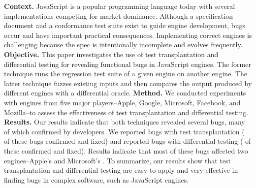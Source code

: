 \textbf{Context.}
JavaScript is a popular programming language today with several
implementations competing for market dominance. Although a
specification document and a conformance test suite exist to guide
engine development, bugs occur and have important practical
consequences. Implementing correct
engines is challenging because the spec is intentionally
incomplete and evolves frequently.
\textbf{Objective.}
This paper investigates the use of test transplantation and
differential testing for revealing functional bugs in JavaScript
engines.  The former technique runs the regression test suite of a
given engine on another engine.  The latter technique fuzzes existing
inputs and then compares the output produced by different engines with
a differential oracle.
\textbf{Method.}
We conducted experiments with engines from five major players--Apple,
Google, Microsoft, Facebook, and Mozilla--to assess the effectiveness
of test transplantation and differential testing.
\textbf{Results.}
Our results indicate that both techniques revealed several bugs, many of which
confirmed by developers. We reported \noBugsTransplantation{} bugs
with test transplantation (\noBugsTransplantationConfirmed{} of these bugs
confirmed and \noBugsTransplantationFixed{} fixed) and reported
\noBugsDifferentialTesting{} bugs with differential testing
(\noBugsDifferentialTestingConfirmed{} of these confirmed
and \noBugsDifferentialTestingFixed{} fixed). Results indicate that
most of these bugs affected two engines--Apple's
\jsc{} and Microsoft's \chakra{}.
To summarize, our results show that
test transplantation and differential testing
are easy to apply and very effective in
finding bugs in complex software, such as JavaScript engines.
